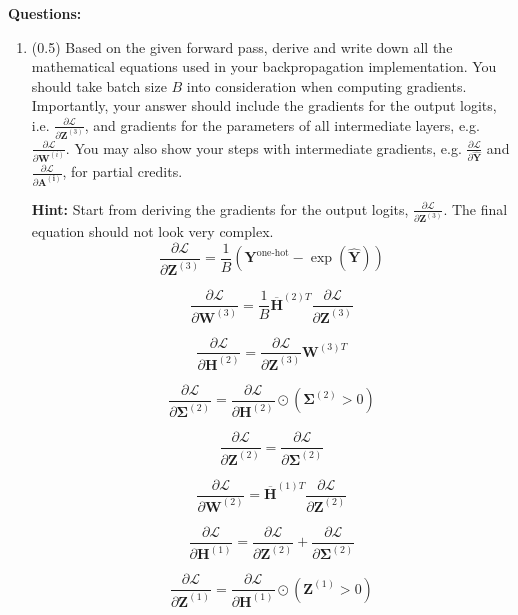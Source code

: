 \documentclass{article}
\begin{document}
\textbf{Questions:}
\begin{enumerate}

    \item (0.5) Based on the given forward pass, derive and write down all the
    mathematical equations used in your backpropagation implementation. You
    should take batch size $B$ into consideration when computing gradients.
    Importantly, your answer should include the gradients for the output logits,
    i.e. $\frac{\partial \mathcal{L}}{\partial \mathbf{Z}^{(3)}}$, and gradients
    for the parameters of all intermediate layers, e.g.
    $\frac{\partial\mathcal{L}}{\partial\mathbf{W}^{(i)}}$. You may also show
    your steps with intermediate gradients, e.g.
    $\frac{\partial\mathcal{L}}{\partial\mathbf{\hat{Y}}}$ and
    $\frac{\partial\mathcal{L}}{\partial\mathbf{\mathbf{A}^{(i)}}}$, for partial
    credits. 
    
    {\bf Hint:} Start from deriving the gradients for the output logits,
    $\frac{\partial \mathcal{L}}{\partial \mathbf{Z}^{(3)}}$. The final equation
    should not look very complex.
\[
\frac{\partial \mathcal{L}}{\partial \mathbf{Z}^{(3)}} = \frac{1}{B} (\mathbf{Y}^{\text{one-hot}} - \exp(\mathbf{\hat{Y}}))
\]

\[
\frac{\partial \mathcal{L}}{\partial \mathbf{W}^{(3)}} = \frac{1}{B} \mathbf{\overline{H}}^{(2) T} \frac{\partial \mathcal{L}}{\partial \mathbf{Z}^{(3)}}
\]

\[
\frac{\partial \mathcal{L}}{\partial \mathbf{H}^{(2)}} = \frac{\partial \mathcal{L}}{\partial \mathbf{Z}^{(3)}} \mathbf{W}^{(3) T}
\]

\[
\frac{\partial \mathcal{L}}{\partial \mathbf{\Sigma}^{(2)}} = \frac{\partial \mathcal{L}}{\partial \mathbf{H}^{(2)}} \odot (\mathbf{\Sigma}^{(2)} > 0)
\]

\[
\frac{\partial \mathcal{L}}{\partial \mathbf{Z}^{(2)}} = \frac{\partial \mathcal{L}}{\partial \mathbf{\Sigma}^{(2)}}
\]

\[
\frac{\partial \mathcal{L}}{\partial \mathbf{W}^{(2)}} = \mathbf{\overline{H}}^{(1)T} \frac{\partial \mathcal{L}}{\partial \mathbf{Z}^{(2)}}
\]

\[
\frac{\partial \mathcal{L}}{\partial \mathbf{H}^{(1)}} = \frac{\partial \mathcal{L}}{\partial \mathbf{Z}^{(2)}} + \frac{\partial \mathcal{L}}{\partial \mathbf{\Sigma}^{(2)}}
\]

\[
\frac{\partial \mathcal{L}}{\partial \mathbf{Z}^{(1)}} = \frac{\partial \mathcal{L}}{\partial \mathbf{H}^{(1)}} \odot (\mathbf{Z}^{(1)} > 0)
\]


\end{enumerate}
\end{document}
